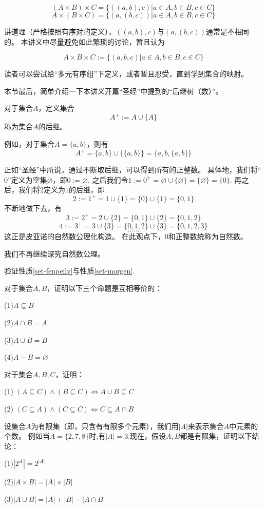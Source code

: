 $$(A\times B)\times C=\{((a,b),c)|a\in A,b\in B, c\in C\}$$
$$A\times (B\times C)=\{(a,(b,c))|a\in A,b\in B, c\in C\}$$

讲道理（严格按照有序对的定义），$((a,b),c)$与$(a,(b,c))$通常是不相同的。
本讲义中尽量避免如此繁琐的讨论，暂且认为

$$A\times B\times C:=\{(a,b,c)|a\in A,b\in B, c\in C\}$$

读者可以尝试给“多元有序组”下定义，或者暂且忍受，直到学到集合的映射。\vs

本节最后，简单介绍一下本讲义开篇“圣经”中提到的“后继树（数）”。
\begin{definition}[后继]
对于集合$A$，定义集合
$$A^+:=A\cup\{A\}$$
称为集合$A$的后继。
\end{definition}

例如，对于集合$A=\{a,b\}$，则有
$$A^+=\{a,b\}\cup\{\{a,b\}\}=\{a,b,\{a,b\}\}$$

正如“圣经”中所说，通过不断取后继，可以得到所有的正整数。
具体地，我们将“$0$”定义为空集$\varnothing$，即$0:=\varnothing$.
之后我们令$1:=0^+=\varnothing\cup\{\varnothing\}=\{\varnothing\}=\{0\}$.
再之后，我们将$2$定义为$1$的后继，即
$$2:=1^+=1\cup\{1\}=\{0\}\cup\{1\}=\{0,1\}$$
不断地做下去，有
$$3:=2^+=2\cup\{2\}=\{0,1\}\cup\{2\}=\{0,1,2\}$$
$$4:=3^+=3\cup\{3\}=\{0,1,2\}\cup\{3\}=\{0,1,2,3\}$$
$$......$$
这正是皮亚诺的自然数公理化构造。
在此观点下，0和正整数统称为自然数。

我们不再继续深究自然数公理。

\fengexian

\begin{prob}验证性质\ref{set-fenpeilv}与性质\ref{set-morgen}.
\end{prob}\vs

\begin{prob}对于集合$A,B$，证明以下三个命题是互相等价的：

(1)$A\subseteq B$

(2)$A\cap B=A$

(3)$A\cup B=B$

(4)$A-B=\varnothing$
\end{prob}\vs

\begin{prob}对于集合$A,B,C$，证明：

(1) $(A\subseteq C)\wedge(B\subseteq C)\Leftrightarrow A\cup B\subseteq C$

(2) $(C\subseteq A)\wedge(C\subseteq C)\Leftrightarrow C\subseteq A\cap B$
\end{prob}\vs

\begin{prob}[元素的个数]
设集合$A$为有限集（即，只含有有限多个元素），我们用$|A|$来表示集合$A$中元素的个数。
例如当$A=\{2,7,8\}$时,有$|A|=3$.现在，假设$A,B$都是有限集，证明以下结论：

(1)$|2^A|=2^{|A|}$

(2)$|A\times B|=|A|\times|B|$

(3)$|A\cup B|=|A|+|B|-|A\cap B|$
\end{prob}\vs

